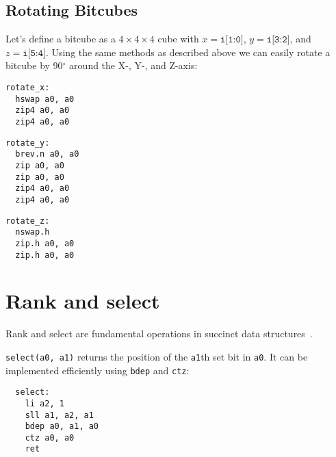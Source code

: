 \subsection{Rotating Bitcubes}

Let's define a bitcube as a $4 \times 4 \times 4$ cube with $x=\texttt{i[1:0]}$,
$y=\texttt{i[3:2]}$, and $z=\texttt{i[5:4]}$. Using the same methods as described
above we can easily rotate a bitcube by 90$^\circ$ around the X-, Y-, and Z-axis:

\begin{multicols}{3}
\begin{minipage}{\linewidth}
\begin{verbatim}
rotate_x:
  hswap a0, a0
  zip4 a0, a0
  zip4 a0, a0
\end{verbatim}
\end{minipage}

\begin{minipage}{\linewidth}
\begin{verbatim}
rotate_y:
  brev.n a0, a0
  zip a0, a0
  zip a0, a0
  zip4 a0, a0
  zip4 a0, a0
\end{verbatim}
\end{minipage}

\begin{minipage}{\linewidth}
\begin{verbatim}
rotate_z:
  nswap.h
  zip.h a0, a0
  zip.h a0, a0
\end{verbatim}
\end{minipage}
\end{multicols}


\section{Rank and select}

Rank and select are fundamental operations in succinct data structures~\cite{SelectX86}.

\texttt{select(a0, a1)} returns the position of the \texttt{a1}th set bit in \texttt{a0}.
It can be implemented efficiently using \texttt{bdep} and \texttt{ctz}:

\begin{minipage}{\linewidth}
\begin{verbatim}
  select:
    li a2, 1
    sll a1, a2, a1
    bdep a0, a1, a0
    ctz a0, a0
    ret
\end{verbatim}
\end{minipage}

